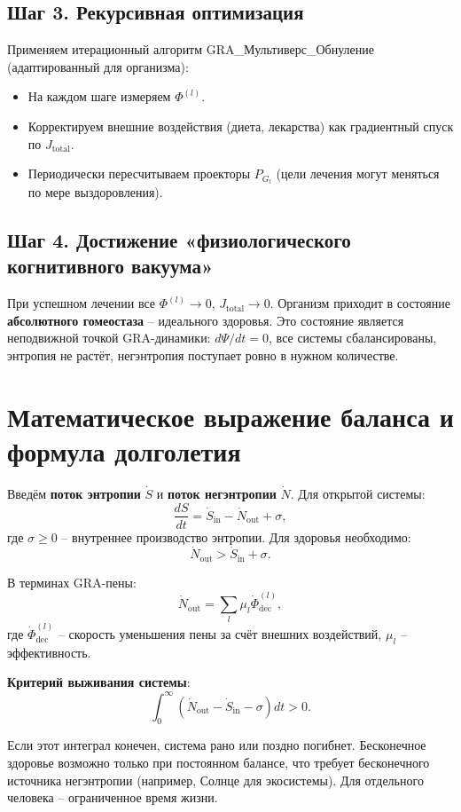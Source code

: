 \documentclass[12pt,a4paper]{article}
\begin{document}
\subsection{Шаг 3. Рекурсивная оптимизация}
Применяем итерационный алгоритм GRA\_Мультиверс\_Обнуление (адаптированный для организма):
\begin{itemize}
    \item На каждом шаге измеряем \(\Phi^{(l)}\).
    \item Корректируем внешние воздействия (диета, лекарства) как градиентный спуск по \(J_{\text{total}}\).
    \item Периодически пересчитываем проекторы \(P_{G_l}\) (цели лечения могут меняться по мере выздоровления).
\end{itemize}

\subsection{Шаг 4. Достижение «физиологического когнитивного вакуума»}
При успешном лечении все \(\Phi^{(l)} \to 0\), \(J_{\text{total}} \to 0\). Организм приходит в состояние \textbf{абсолютного гомеостаза} – идеального здоровья. Это состояние является неподвижной точкой GRA-динамики: \(d\Psi/dt = 0\), все системы сбалансированы, энтропия не растёт, негэнтропия поступает ровно в нужном количестве.

\section{Математическое выражение баланса и формула долголетия}

Введём \textbf{поток энтропии} \(\dot{S}\) и \textbf{поток негэнтропии} \(\dot{N}\). Для открытой системы:
\[
\frac{dS}{dt} = \dot{S}_{\text{in}} - \dot{N}_{\text{out}} + \sigma,
\]
где \(\sigma \ge 0\) – внутреннее производство энтропии. Для здоровья необходимо:
\[
\dot{N}_{\text{out}} > \dot{S}_{\text{in}} + \sigma.
\]

В терминах GRA-пены:
\[
\dot{N}_{\text{out}} = \sum_{l} \mu_l \dot{\Phi}^{(l)}_{\text{dec}},
\]
где \(\dot{\Phi}^{(l)}_{\text{dec}}\) – скорость уменьшения пены за счёт внешних воздействий, \(\mu_l\) – эффективность.

\textbf{Критерий выживания системы}:
\[
\int_0^\infty \left( \dot{N}_{\text{out}} - \dot{S}_{\text{in}} - \sigma \right) dt > 0.
\]

Если этот интеграл конечен, система рано или поздно погибнет. Бесконечное здоровье возможно только при постоянном балансе, что требует бесконечного источника негэнтропии (например, Солнце для экосистемы). Для отдельного человека – ограниченное время жизни.
\end{document}
